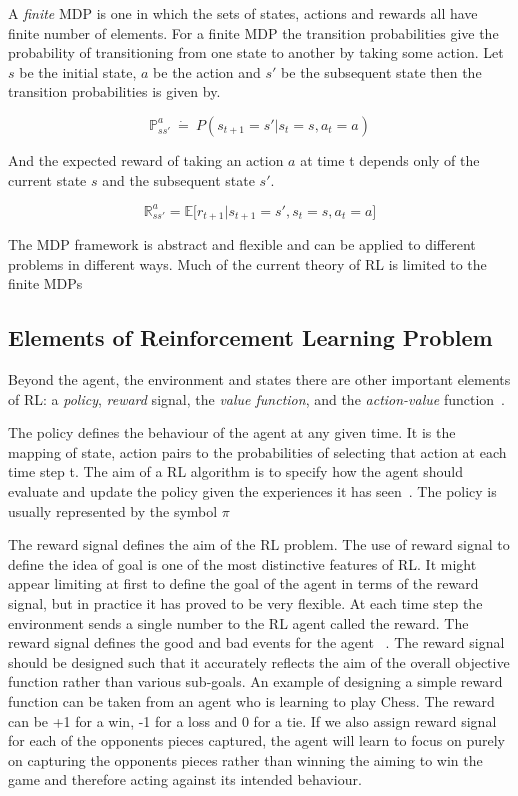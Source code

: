 A \emph{finite} MDP is one in which the sets of states, actions and rewards all have finite number of elements. 
For a finite MDP the transition probabilities give the probability of transitioning from one state to another by taking some action. Let $s$ be the initial state, $a$ be the action and $s'$ be the subsequent state then the transition probabilities is given by.

\begin{equation}
	\mathbb{P}^a_{ss'} \ \dot{=} \  P(s_{t+1}=s' | s_t = s, a_t = a)
\end{equation}

And the expected reward of taking an action $a$ at time t depends only of the current state $s$ and the subsequent state $s'$.

\begin{equation}
\mathbb{R}^a_{ss'} = \mathbb{E} \big[r_{t+1} |s_{t+1} = s', s_t = s, a_t = a \big]
\end{equation}

The MDP framework is abstract and flexible and can be applied to different problems in different ways. Much of the current theory of RL is limited to the finite MDPs~\cite{sutton2018reinforcement}

\subsection{Elements of Reinforcement Learning Problem}

Beyond the agent, the environment and states there are other important elements of RL: a \emph{policy}, \emph{reward} signal, the \emph{value function}, and the \emph{action-value} function~\cite{sutton2018reinforcement}.


The policy defines the behaviour of the agent at any given time. It is the mapping of state, action pairs to the probabilities of selecting that action at each time step t. The aim of a RL algorithm is to specify how the agent should evaluate and update the policy given the experiences it has seen~\cite{sutton2018reinforcement}. The policy is usually represented by the symbol $\pi$


The reward signal defines the aim of the RL problem. The use of reward signal to define the idea of goal is one of the most distinctive features of RL. It might appear limiting at first to define the goal of the agent in terms of the reward signal, but in practice it has proved to be very flexible. At each time step the environment sends a single number to the RL agent called the reward. The reward signal defines the good and bad events for the agent ~\cite{sutton2018reinforcement}. The reward signal should be designed such that it accurately reflects the aim of the overall objective function rather than various sub-goals. An example of designing a simple reward function can be taken from an agent who is learning to play Chess. The reward can be +1 for a win, -1 for a loss and 0 for a tie. If we also assign reward signal for each of the opponents pieces captured, the agent will learn to focus on purely on capturing the opponents pieces rather than winning the aiming to win the game and therefore acting against its intended behaviour. 

